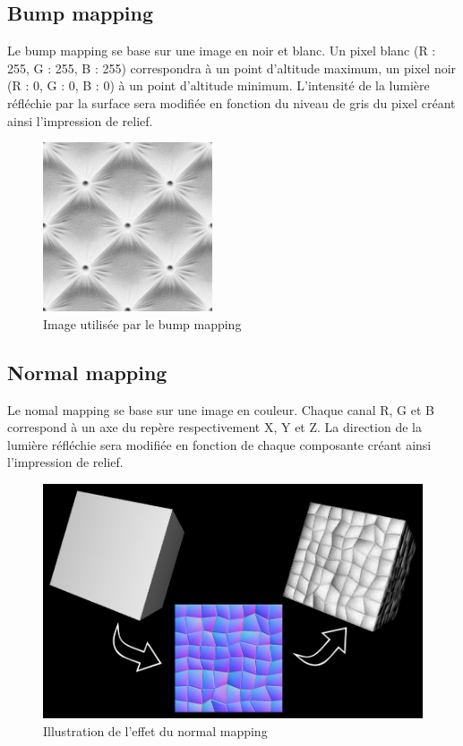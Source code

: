 \documentclass[11pt]{report}
\begin{document}
\subsection{Bump mapping}

Le bump mapping se base sur une image en noir et blanc. Un pixel blanc (R : 255, G : 255, B : 255) correspondra à un point d'altitude maximum, un pixel noir (R : 0, G : 0, B : 0) à un point d’altitude minimum. L'intensité de la lumière réfléchie par la surface sera modifiée en fonction du niveau de gris du pixel créant ainsi l'impression de relief.

\begin{figure}[htbp]
\centering
\includegraphics[width=5cm]{bump.png}
\caption{Image utilisée par le bump mapping}
\end{figure}

\subsection{Normal mapping}

Le nomal mapping se base sur une image en couleur. Chaque canal R, G et B correspond à un axe du repère respectivement X, Y et Z. La direction de la lumière réfléchie sera modifiée en fonction de chaque composante créant ainsi l’impression de relief.

\begin{figure}[htbp]
\centering
\includegraphics[scale=0.30]{normal_mapping.jpg}
\caption{Illustration de l'effet du normal mapping}
\end{figure}
\end{document}
